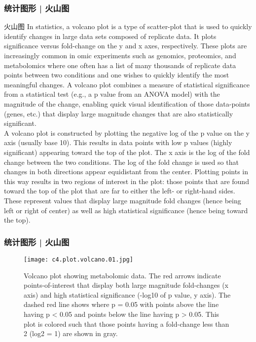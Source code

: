 \begin{frame}
  \frametitle{统计图形 | 火山图}
  \begin{block}{火山图}
    {\footnotesize
    In statistics, a volcano plot is a type of scatter-plot that is used to quickly identify changes in large data sets composed of replicate data. It plots significance versus fold-change on the y and x axes, respectively. These plots are increasingly common in omic experiments such as genomics, proteomics, and metabolomics where one often has a list of many thousands of replicate data points between two conditions and one wishes to quickly identify the most meaningful changes. A volcano plot combines a measure of statistical significance from a statistical test (e.g., a p value from an ANOVA model) with the magnitude of the change, enabling quick visual identification of those data-points (genes, etc.) that display large magnitude changes that are also statistically significant.\\
    \vspace{0.5em}
A volcano plot is constructed by plotting the negative log of the p value on the y axis (usually base 10). This results in data points with low p values (highly significant) appearing toward the top of the plot. The x axis is the log of the fold change between the two conditions. The log of the fold change is used so that changes in both directions appear equidistant from the center. Plotting points in this way results in two regions of interest in the plot: those points that are found toward the top of the plot that are far to either the left- or right-hand sides. These represent values that display large magnitude fold changes (hence being left or right of center) as well as high statistical significance (hence being toward the top).\\
    }
  \end{block}
\end{frame}

\begin{frame}
  \frametitle{统计图形 | 火山图}
  \begin{figure}
    \centering
    \texttt{[image: c4.plot.volcano.01.jpg]}
    \caption{{\scriptsize Volcano plot showing metabolomic data. The red arrows indicate points-of-interest that display both large magnitude fold-changes (x axis) and high statistical significance (-log10 of p value, y axis). The dashed red line shows where p = 0.05 with points above the line having p < 0.05 and points below the line having p > 0.05. This plot is colored such that those points having a fold-change less than 2 (log2 = 1) are shown in gray.\\ }}
  \end{figure}
\end{frame}

